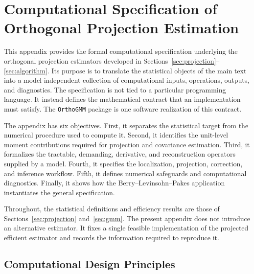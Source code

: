 \section{Computational Specification of Orthogonal Projection Estimation}
\label{app:computational_specification}

This appendix provides the formal computational specification underlying the
orthogonal projection estimators developed in Sections~\ref{sec:projection}--
\ref{sec:algorithm}. Its purpose is to translate the statistical objects of the
main text into a model-independent collection of computational inputs,
operations, outputs, and diagnostics. The specification is not tied to a
particular programming language. It instead defines the mathematical contract
that an implementation must satisfy. The \texttt{OrthoGMM} package is one
software realization of this contract.

The appendix has six objectives. First, it separates the statistical target
from the numerical procedure used to compute it. Second, it identifies the
unit-level moment contributions required for projection and covariance
estimation. Third, it formalizes the tractable, demanding, derivative, and
reconstruction operators supplied by a model. Fourth, it specifies the
localization, projection, correction, and inference workflow. Fifth, it defines
numerical safeguards and computational diagnostics. Finally, it shows how the
Berry--Levinsohn--Pakes application instantiates the general specification.

Throughout, the statistical definitions and efficiency results are those of
Sections~\ref{sec:projection} and~\ref{sec:gmm}. The present appendix does not
introduce an alternative estimator. It fixes a single feasible implementation
of the projected efficient estimator and records the information required to
reproduce it.

\subsection{Computational Design Principles}
\label{app:design_principles}

